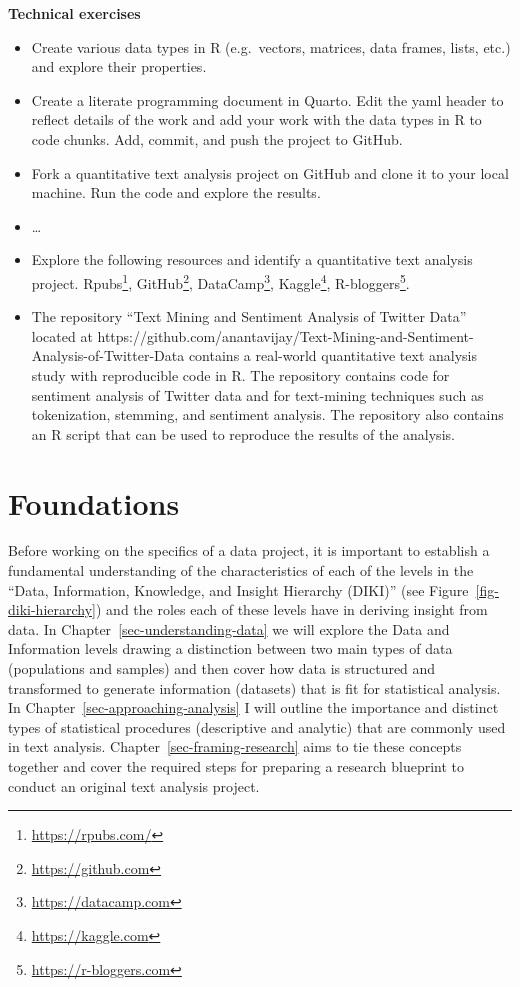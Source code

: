 \documentclass[
  letterpaper,
]{latex/krantz}
\providecommand{\tightlist}{%
  \setlength{\itemsep}{0pt}\setlength{\parskip}{0pt}}\usepackage{longtable,booktabs,array}
\DeclareRobustCommand{\href}[2]{#2\footnote{\url{#1}}}
\begin{document}
\begin{tcolorbox}[enhanced jigsaw, left=2mm, arc=.35mm, colback=white, rightrule=.15mm, toprule=.15mm, breakable, leftrule=.75mm, opacityback=0, bottomrule=.15mm]

\textbf{Technical exercises}

\begin{itemize}
\tightlist
\item
  Create various data types in R (e.g.~vectors, matrices, data frames,
  lists, etc.) and explore their properties.
\item
  Create a literate programming document in Quarto. Edit the yaml header
  to reflect details of the work and add your work with the data types
  in R to code chunks. Add, commit, and push the project to GitHub.
\item
  Fork a quantitative text analysis project on GitHub and clone it to
  your local machine. Run the code and explore the results.
\item
  \ldots{}
\item
  Explore the following resources and identify a quantitative text
  analysis project. \href{https://rpubs.com/}{Rpubs},
  \href{https://github.com}{GitHub},
  \href{https://datacamp.com}{DataCamp},
  \href{https://kaggle.com}{Kaggle},
  \href{https://r-bloggers.com}{R-bloggers}.
\item
  The repository ``Text Mining and Sentiment Analysis of Twitter Data''
  located at
  https://github.com/anantavijay/Text-Mining-and-Sentiment-Analysis-of-Twitter-Data
  contains a real-world quantitative text analysis study with
  reproducible code in R. The repository contains code for sentiment
  analysis of Twitter data and for text-mining techniques such as
  tokenization, stemming, and sentiment analysis. The repository also
  contains an R script that can be used to reproduce the results of the
  analysis.
\end{itemize}

\end{tcolorbox}

\part{Foundations}

Before working on the specifics of a data project, it is important to
establish a fundamental understanding of the characteristics of each of
the levels in the ``Data, Information, Knowledge, and Insight Hierarchy
(DIKI)'' (see Figure~\ref{fig-diki-hierarchy}) and the roles each of
these levels have in deriving insight from data. In
Chapter~\ref{sec-understanding-data} we will explore the Data and
Information levels drawing a distinction between two main types of data
(populations and samples) and then cover how data is structured and
transformed to generate information (datasets) that is fit for
statistical analysis. In Chapter~\ref{sec-approaching-analysis} I will
outline the importance and distinct types of statistical procedures
(descriptive and analytic) that are commonly used in text analysis.
Chapter~\ref{sec-framing-research} aims to tie these concepts together
and cover the required steps for preparing a research blueprint to
conduct an original text analysis project.
\end{document}
